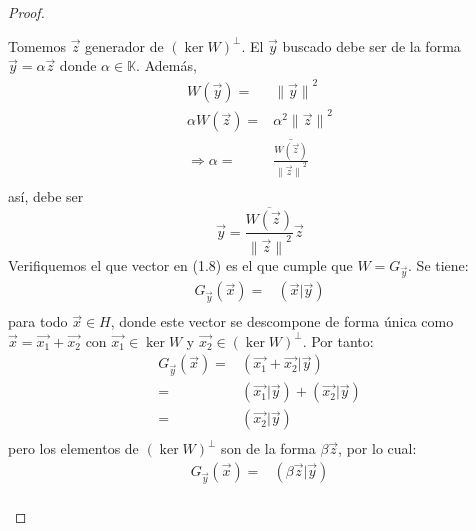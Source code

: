 \documentclass[12pt]{report}
\theoremstyle{largebreak}
\newcommand\norm[1]{\ensuremath{\|#1\|}}
\newcommand\pint[2]{\ensuremath{\left(#1\big| #2\right)}}
\newcommand\conj[1]{\ensuremath{\overline{#1}}}
\begin{document}
\begin{proof}
\begin{enumerate}
            Tomemos $\vec{z}$ generador de $\left(\ker W\right)^\perp$. El $\vec{y}$ buscado debe ser de la forma $\vec{y}=\alpha\vec{z}$ donde $\alpha\in\mathbb{K}$. Además,
            \begin{equation*}
                \begin{split}
                    W(\vec{y})=&\norm{\vec{y}}^2\\
                    \alpha W(\vec{z})=&\alpha^2\norm{\vec{z}}^2\\
                    \Rightarrow \alpha=&\conj{\frac{W(\vec{z})}{\norm{\vec{z}}^2}}\\
                \end{split}
            \end{equation*}
            así, debe ser
            \begin{equation}
                \vec{y}=\conj{\frac{W(\vec{z})}{\norm{\vec{z}}^2}}\vec{z}
            \end{equation}
            Verifiquemos el que vector en (1.8) es el que cumple que $W=G_{\vec{y}}$. Se tiene:
            \begin{equation*}
                \begin{split}
                    G_{\vec{y}}(\vec{x})=&\pint{\vec{x}}{\vec{y}} \\
                \end{split}
            \end{equation*}
            para todo $\vec{x}\in H$, donde este vector se descompone de forma única como $\vec{x}=\vec{x_1}+\vec{x_2}$ con $\vec{x_1}\in\ker W$ y $\vec{x_2}\in\left(\ker W\right)^\perp$. Por tanto:
            \begin{equation*}
                \begin{split}
                    G_{\vec{y}}(\vec{x})=&\pint{\vec{x_1}+\vec{x_2}}{\vec{y}} \\
                    =&\pint{\vec{x_1}}{\vec{y}}+\pint{\vec{x_2}}{\vec{y}} \\
                    =&\pint{\vec{x_2}}{\vec{y}} \\
                \end{split}
            \end{equation*}
            pero los elementos de $\left(\ker W\right)^\perp$ son de la forma $\beta\vec{z}$, por lo cual:\begin{equation*}
                \begin{split}
                    G_{\vec{y}}(\vec{x})=&\pint{\beta\vec{z}}{\vec{y}} \\

\end{split}
\end{equation*}
\end{enumerate}
\end{proof}
\end{document}
